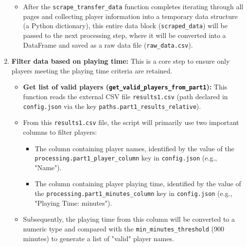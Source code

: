 \documentclass[12pt, a4paper]{report}
\begin{document}
\begin{enumerate}[label=\textbf{Step \arabic*:}, leftmargin=* , itemsep=1ex]
\begin{itemize}[leftmargin=0em]
\begin{itemize}
\begin{itemize}
            \end{itemize}
        \end{itemize}
        \item After the \texttt{scrape\_transfer\_data} function completes iterating through all pages and collecting player information into a temporary data structure (a Python dictionary), this entire data block (\texttt{scraped\_data}) will be passed to the next processing step, where it will be converted into a DataFrame and saved as a raw data file (\texttt{raw\_data.csv}).
    \end{itemize}

    \item \textbf{Filter data based on playing time:}
    This is a core step to ensure only players meeting the playing time criteria are retained.
    \begin{itemize}[leftmargin=0em]
        \item \textbf{Get list of valid players (\texttt{get\_valid\_players\_from\_part1}):} This function reads the external CSV file \texttt{results1.csv} (path declared in \texttt{config.json} via the key \texttt{paths.part1\_results\_relative}).
        \item From this \texttt{results1.csv} file, the script will primarily use two important columns to filter players:
        \begin{itemize}
            \item The column containing player names, identified by the value of the \newline
            \texttt{processing.part1\_player\_column} key in \texttt{config.json} (e.g., "Name").
            \item The column containing player playing time, identified by the value of the \texttt{processing.part1\_minutes\_column} key in \texttt{config.json} (e.g., "Playing Time: minutes").
        \end{itemize}
        \item Subsequently, the playing time from this column will be converted to a numeric type and compared with the \texttt{min\_minutes\_threshold} (900 minutes) to generate a list of "valid" player names.
    \end{itemize}


\end{enumerate}
\end{document}
